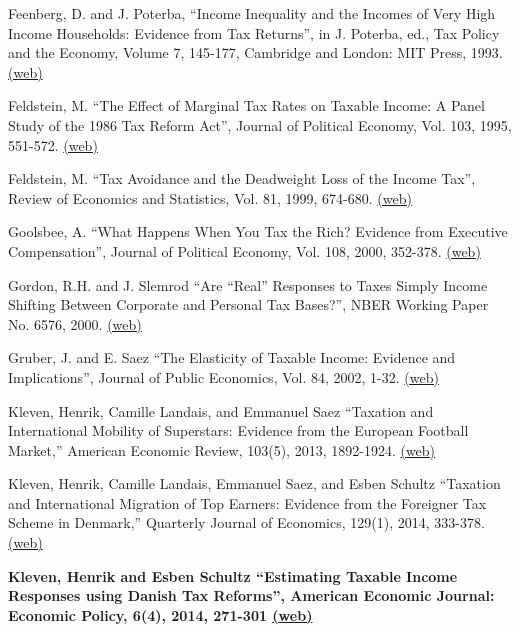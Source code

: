 \documentclass[landscape]{slides}
\begin{document}
\begin{slide}
{Feenberg, D. and J. Poterba, ``Income Inequality and the Incomes of Very High Income Households: Evidence from Tax Returns'', in J. Poterba, ed., Tax Policy and the Economy, Volume 7, 145-177, Cambridge and London: MIT Press, 1993. \href{http://www.jstor.org/stable/pdfplus/20060632.pdf} {(web)}

Feldstein, M. ``The Effect of Marginal Tax Rates on Taxable Income: A Panel Study of the 1986 Tax Reform Act'', Journal of Political Economy, Vol. 103, 1995, 551-572. \href{http://links.jstor.org/stable/pdfplus/2138698.pdf} {(web)} 

Feldstein, M. ``Tax Avoidance and the Deadweight Loss of the Income Tax'', Review of Economics and Statistics, Vol. 81, 1999, 674-680. \href{http://links.jstor.org/stable/pdfplus/2646716.pdf} {(web)}

Goolsbee, A. ``What Happens When You Tax the Rich? Evidence from Executive Compensation'', Journal of Political Economy, Vol. 108, 2000, 352-378. \href{http://links.jstor.org/stable/pdfplus/3038281.pdf} {(web)} 

Gordon, R.H. and J. Slemrod ``Are ``Real'' Responses to Taxes Simply Income Shifting Between Corporate and Personal Tax Bases?'', NBER Working Paper No. 6576, 2000. \href{http://www.nber.org/papers/w6576} {(web)}

Gruber, J. and E. Saez ``The Elasticity of Taxable Income: Evidence and Implications'', Journal of Public Economics, Vol. 84, 2002, 1-32. \href{http://elsa.berkeley.edu/~saez/course/Gruber and Saez_JPubE(2002).pdf} {(web)}

Kleven, Henrik, Camille Landais, and Emmanuel Saez ``Taxation and International Mobility of Superstars: Evidence from the European Football Market,'' American Economic Review, 103(5), 2013, 1892-1924. \href{http://elsa.berkeley.edu/~saez/kleven-landais-saezAER13football.pdf} {(web)}

Kleven, Henrik, Camille Landais, Emmanuel Saez, and Esben Schultz ``Taxation and International Migration of Top Earners: Evidence from the Foreigner Tax Scheme in Denmark,'' Quarterly Journal of Economics, 129(1), 2014, 333-378.
\href{http://elsa.berkeley.edu/~saez/kleven-landais-saez-schultzQJE14danishscheme.pdf} {(web)}

\textbf{Kleven, Henrik and Esben Schultz  ``Estimating Taxable Income Responses
using Danish Tax Reforms'', American Economic Journal: Economic Policy, 6(4), 2014, 271-301
\href{http://elsa.berkeley.edu/~saez/course/kleven-schultz_may2012.pdf} {(web)} }

}
\end{slide}
\end{document}
